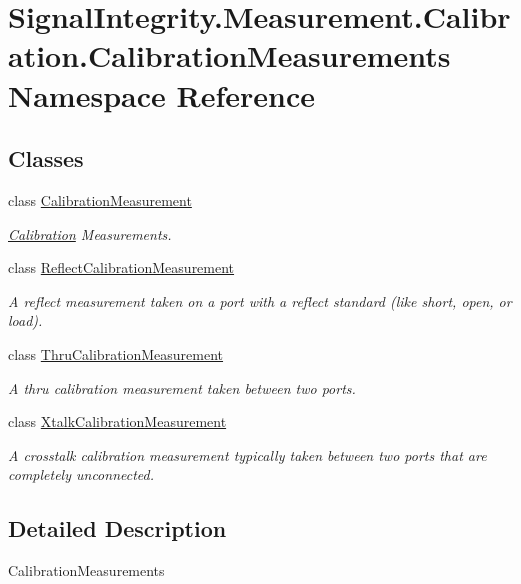 \hypertarget{namespaceSignalIntegrity_1_1Measurement_1_1Calibration_1_1CalibrationMeasurements}{}\section{Signal\+Integrity.\+Measurement.\+Calibration.\+Calibration\+Measurements Namespace Reference}
\label{namespaceSignalIntegrity_1_1Measurement_1_1Calibration_1_1CalibrationMeasurements}
\subsection*{Classes}
\begin{DoxyCompactItemize}
\item 
class \hyperlink{classSignalIntegrity_1_1Measurement_1_1Calibration_1_1CalibrationMeasurements_1_1CalibrationMeasurement}{Calibration\+Measurement}
\begin{DoxyCompactList}\small\item\em \hyperlink{namespaceSignalIntegrity_1_1Measurement_1_1Calibration_1_1Calibration}{Calibration} Measurements. \end{DoxyCompactList}\item 
class \hyperlink{classSignalIntegrity_1_1Measurement_1_1Calibration_1_1CalibrationMeasurements_1_1ReflectCalibrationMeasurement}{Reflect\+Calibration\+Measurement}
\begin{DoxyCompactList}\small\item\em A reflect measurement taken on a port with a reflect standard (like short, open, or load). \end{DoxyCompactList}\item 
class \hyperlink{classSignalIntegrity_1_1Measurement_1_1Calibration_1_1CalibrationMeasurements_1_1ThruCalibrationMeasurement}{Thru\+Calibration\+Measurement}
\begin{DoxyCompactList}\small\item\em A thru calibration measurement taken between two ports. \end{DoxyCompactList}\item 
class \hyperlink{classSignalIntegrity_1_1Measurement_1_1Calibration_1_1CalibrationMeasurements_1_1XtalkCalibrationMeasurement}{Xtalk\+Calibration\+Measurement}
\begin{DoxyCompactList}\small\item\em A crosstalk calibration measurement typically taken between two ports that are completely unconnected. \end{DoxyCompactList}\end{DoxyCompactItemize}


\subsection{Detailed Description}
\begin{DoxyVerb}CalibrationMeasurements\end{DoxyVerb}
 